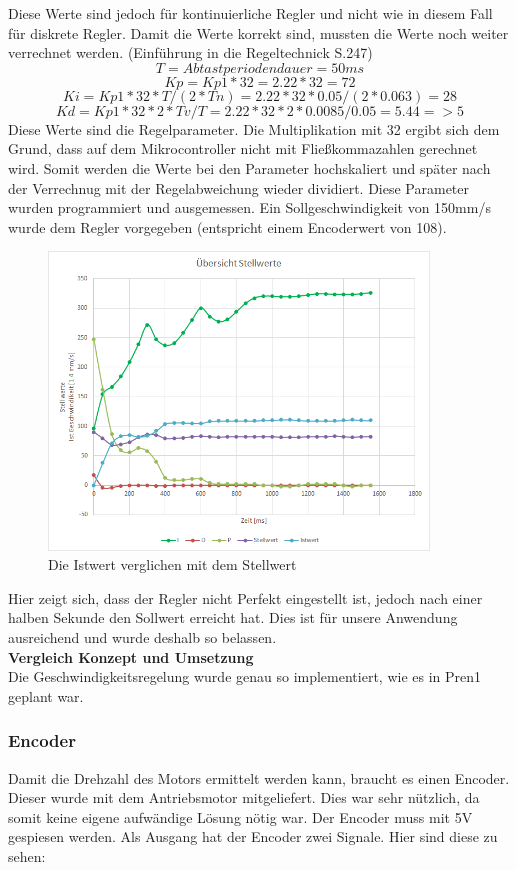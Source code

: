 Diese Werte sind jedoch für kontinuierliche Regler und nicht wie in diesem Fall für diskrete Regler. Damit die Werte korrekt sind, mussten die Werte noch weiter verrechnet werden. (Einführung in die Regeltechnick S.247)
\[ T=Abtastperiodendauer=50ms\]
\[ Kp=Kp1*32=2.22*32=72\]
\[ Ki=Kp1*32*T/(2*Tn)=2.22*32*0.05/(2*0.063)=28\]
\[ Kd=Kp1*32*2*Tv/T=2.22*32*2*0.0085/0.05=5.44 =>5\]
Diese Werte sind die Regelparameter. Die Multiplikation mit 32 ergibt sich dem Grund, dass auf dem Mikrocontroller nicht mit Fließkommazahlen gerechnet wird. Somit werden die Werte bei den Parameter hochskaliert und später nach der Verrechnug mit der Regelabweichung wieder dividiert.
Diese Parameter wurden programmiert und ausgemessen. Ein Sollgeschwindigkeit von 150mm/s wurde dem Regler vorgegeben (entspricht einem Encoderwert von 108).
\begin{figure}[H]%
\centering
\includegraphics[width=0.9\textwidth]{03_Loesungskonzept/pictures/StellwertePID.png}
\caption{Die Istwert verglichen mit dem Stellwert}
\label{fig:IstSollwertVergleich}
\end{figure}
Hier zeigt sich, dass der Regler nicht Perfekt eingestellt ist, jedoch nach einer halben Sekunde den Sollwert erreicht hat. Dies ist für unsere Anwendung ausreichend und wurde deshalb so belassen.\\[0.2cm]
\textbf{Vergleich Konzept und Umsetzung}\\[0.2cm]
Die Geschwindigkeitsregelung wurde genau so implementiert, wie es in Pren1 geplant war.
\subsubsection{Encoder}
Damit die Drehzahl des Motors ermittelt werden kann, braucht es einen Encoder. Dieser wurde mit dem Antriebsmotor mitgeliefert. Dies war sehr nützlich, da somit keine eigene aufwändige Lösung nötig war. Der Encoder muss mit 5V gespiesen werden. Als Ausgang hat der Encoder zwei Signale. Hier sind diese zu sehen:

